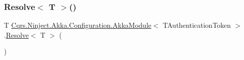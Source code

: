 \mbox{\label{classCqrs_1_1Ninject_1_1Akka_1_1Configuration_1_1AkkaModule_a27665aec43ab831758d85bce822e38d6_a27665aec43ab831758d85bce822e38d6}} 
\subsubsection{\texorpdfstring{Resolve$<$ T $>$()}{Resolve< T >()}}
{\footnotesize\ttfamily T \hyperlink{classCqrs_1_1Ninject_1_1Akka_1_1Configuration_1_1AkkaModule}{Cqrs.\+Ninject.\+Akka.\+Configuration.\+Akka\+Module}$<$ T\+Authentication\+Token $>$.\hyperlink{classCqrs_1_1Ninject_1_1Akka_1_1Configuration_1_1AkkaModule_ab5fee79572d239a8bf4e30080c1b8fe8_ab5fee79572d239a8bf4e30080c1b8fe8}{Resolve}$<$ T $>$ (\begin{DoxyParamCaption}{ }\end{DoxyParamCaption})\hspace{0.3cm}{\ttfamily [protected]}}

